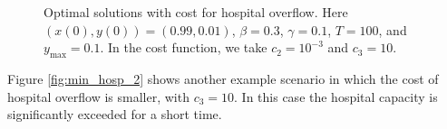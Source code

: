 \documentclass[english,12pt,letter]{article}
\newcommand{\ymax}{y_\text{max}}
\begin{document}
\begin{figure}
    \centering
    \caption{Optimal solutions with cost for hospital overflow.  Here $(x(0),y(0)) = (0.99,0.01)$, $\beta=0.3$, $\gamma=0.1$, $T=100$,
        and $\ymax=0.1$.
        In the cost function, we take $c_2=10^{-3}$ and $c_3=10$.\label{fig:min_hosp_1}}
\end{figure}

Figure \ref{fig:min_hosp_2} shows another example scenario in which the cost of hospital overflow is smaller,
with $c_3=10$.  In this case the hospital capacity is significantly exceeded for a short time.
\end{document}
